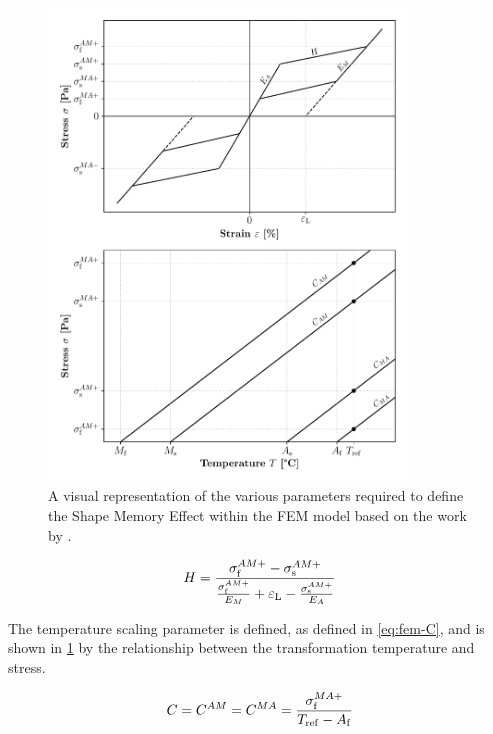 \begin{figure}[hbt!]
    \centering
    \includegraphics[width=0.85\textwidth]{images/chap2/fem-wp-graph.pdf}
    \caption{A visual representation of the various parameters required to define the Shape Memory Effect within the FEM model based on the work by \cite{jaberAnsysParametersShape2018}.}
    \label{fig:fem-wp-graph}
\end{figure}

\begin{equation}
    \label{eq:fem-h}
    H = \frac{\sigma_\mathrm{f}^{AM+}-\sigma_\mathrm{s}^{AM+}}{\frac{\sigma_\mathrm{f}^{AM+}}{E_M}+\varepsilon_\mathrm{L}-\frac{\sigma_\mathrm{s}^{AM+}}{E_A}}
\end{equation}

The temperature scaling parameter is defined, as defined in \cref{eq:fem-C}, and is shown in \cref{fig:fem-wp-graph} by the relationship between the transformation temperature and stress.

\begin{equation}
    \label{eq:fem-C}
    C = C^{AM}=C^{MA}=\frac{\sigma_\mathrm{f}^{MA+}}{T_\mathrm{ref}-A_\mathrm{f}}
\end{equation}

